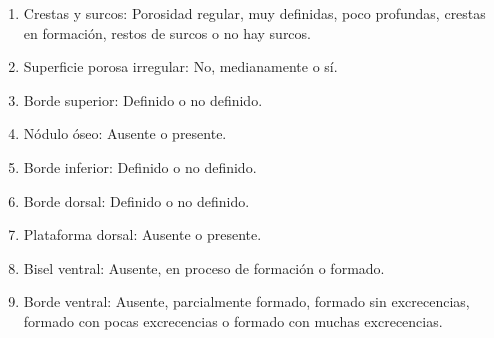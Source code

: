 \begin{enumerate}
	\item Crestas y surcos: Porosidad regular, muy definidas, poco profundas, crestas en formación, restos de surcos o no hay surcos.
	\item Superficie porosa irregular: No, medianamente o sí.
	\item Borde superior: Definido o no definido.
	\item Nódulo óseo: Ausente o presente.
	\item Borde inferior: Definido o no definido.
	\item Borde dorsal: Definido o no definido.
	\item Plataforma dorsal: Ausente o presente.
	\item Bisel ventral: Ausente, en proceso de formación o formado.
	\item Borde ventral: Ausente, parcialmente formado, formado sin excrecencias, formado con pocas excrecencias o formado con muchas excrecencias.
\end{enumerate}

\begin{table}[H]
	\caption{Algunos ejemplos de las características consideradas por Todd.}\label{table:caracteristicas_todd}
\end{table}

